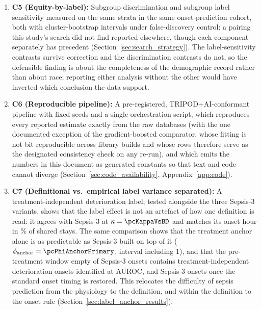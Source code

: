 \begin{enumerate}
    \item \textbf{C5 (Equity-by-label):} Subgroup discrimination and subgroup
    label sensitivity measured on the same strata in the same
    onset-prediction cohort, both with cluster-bootstrap intervals under
    false-discovery control: a pairing this study's search did not find
    reported elsewhere, though each component separately has precedent
    (Section~\ref{sec:search_strategy}). The label-sensitivity contrasts
    survive correction and the discrimination contrasts do not, so the
    defensible finding is about the completeness of the demographic record
    rather than about race; reporting either analysis without the other would
    have inverted which conclusion the data support.

    \item \textbf{C6 (Reproducible pipeline):} A pre-registered,
    TRIPOD+AI-conformant pipeline with fixed seeds and a single orchestration
    script, which reproduces every reported estimate exactly from the raw
    databases (with the one documented exception of the gradient-boosted
    comparator, whose fitting is not bit-reproducible across library builds and
    whose rows therefore serve as the designated consistency check on any
    re-run), and which emits the numbers in this document as generated
    constants so that text and code cannot diverge
    (Section~\ref{sec:code_availability}, Appendix~\ref{app:code}).

    \item \textbf{C7 (Definitional vs.\ empirical label variance separated):}
    A treatment-independent deterioration label, tested alongside the three
    Sepsis-3 variants, shows that the label effect is not an artefact of how one
    definition is read: it agrees with Sepsis-3 at $\kappa = \pcKappaVsBD$ and
    matches its onset hour in \pcPctExactMatchD\% of shared stays. The same
    comparison shows that the treatment anchor alone is as predictable as
    Sepsis-3 built on top of it ($\phi_{\text{anchor}} = \pcPhiAnchorPrimary$,
    interval including 1), and that the pre-treatment window empty of Sepsis-3
    onsets contains
    \pcPreTreatOnsetsVarD{} treatment-independent deterioration onsets
    identified at \pcPreTreatAurocPrimaryD{} AUROC, and
    \pcPreTreatOnsetsVarF{} Sepsis-3 onsets once the standard onset timing is
    restored. This relocates the difficulty of sepsis prediction from the
    physiology to the definition, and within the definition to the onset rule
    (Section~\ref{sec:label_anchor_results}).
\end{enumerate}


